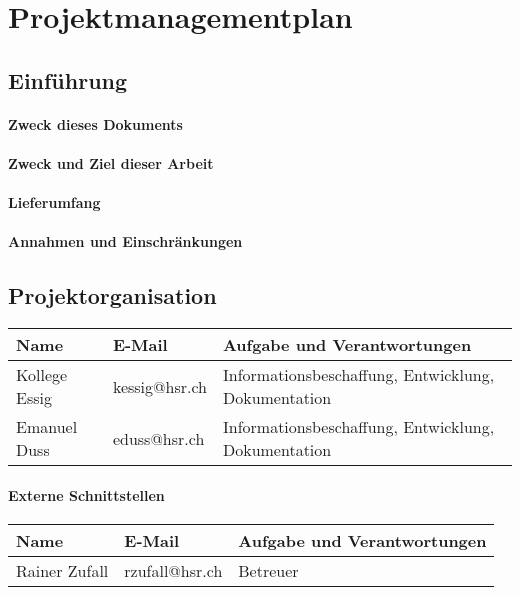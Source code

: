 \chapter{Projektmanagementplan}

\section{Einführung}

\subsubsection*{Zweck dieses Dokuments}

\subsubsection*{Zweck und Ziel dieser Arbeit}

\subsubsection*{Lieferumfang}

\subsubsection*{Annahmen und Einschränkungen}

\section{Projektorganisation}

\begin{tabular}[t]{|l|l|l|} \hline
\textbf{Name} & \textbf{E-Mail} & \textbf{Aufgabe und Verantwortungen} \\ \hline \hline
Kollege Essig         & kessig@hsr.ch    & Informationsbeschaffung, Entwicklung, Dokumentation \\ \hline
Emanuel Duss          & eduss@hsr.ch     & Informationsbeschaffung, Entwicklung, Dokumentation \\ \hline
\end{tabular}

\subsubsection*{Externe Schnittstellen}

\begin{tabular}[t]{|l|l|l|} \hline
\textbf{Name} & \textbf{E-Mail} & \textbf{Aufgabe und Verantwortungen} \\ \hline \hline
Rainer Zufall  & rzufall@hsr.ch  & Betreuer \\ \hline
\end{tabular}

